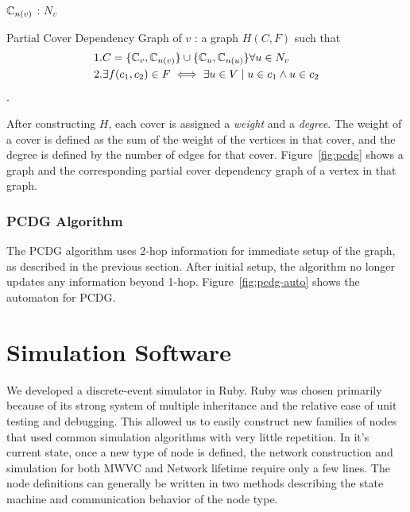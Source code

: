 \begin{defn}
${\mathbb C}_{n(v)}$ : $N_v$
\end{defn} 

\begin{defn}
Partial Cover Dependency Graph of $v$ : a graph $H(C,F)$ such that \begin{align*}& 1. C = \{{\mathbb C}_v, {\mathbb C}_{n(v)}\} \cup \{{\mathbb C}_u, {\mathbb C}_{n(u)}\} \forall u \in N_v\\ & 2. \exists f(c_1, c_2) \in F \iff \exists u \in V \mid u \in c_1 \land u \in c_2\end{align*}.
\end{defn} 

After constructing $H$, each cover is assigned a {\em weight} and a {\em degree}. The weight of a cover is defined as the sum of the weight of the vertices in that cover, and the degree is defined by the number of edges for that cover. Figure~\ref{fig:pcdg} shows a graph and the corresponding partial cover dependency graph of a vertex in that graph.



\subsubsection{PCDG Algorithm}
\label{sec:pcdg-alg}

The PCDG algorithm uses 2-hop information for immediate setup of the graph, as described in the previous section. After initial setup, the algorithm no longer updates any information beyond 1-hop. Figure~\ref{fig:pcdg-auto} shows the automaton for PCDG.


\section{Simulation Software}
\label{sec:simulator}

We developed a discrete-event simulator in Ruby. Ruby was chosen primarily because of its strong system of multiple inheritance and the relative ease of unit testing and debugging. This allowed us to easily construct new families of nodes that used common simulation algorithms with very little repetition. In it's current state, once a new type of node is defined, the network construction and simulation for both MWVC and Network lifetime require only a few lines. The node definitions can generally be written in two methods describing the state machine and communication behavior of the node type.

